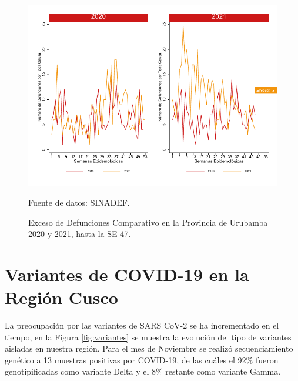 \documentclass[12pt,a4paper,openany]{book}
\begin{document}
		\begin{figure}[h]
			\caption{Exceso de Defunciones Comparativo en la Provincia de Urubamba 2020 y 2021, hasta la SE 47.}\label{fig:exceso_urub}
			\begin{center}
				\includegraphics[width=0.7\linewidth]{../figuras/exceso_13}
			\end{center}
			{\footnotesize {Fuente de datos: SINADEF.}}
		\end{figure}
		
		\clearpage
		
		\clearpage
		
		\section* {Variantes de COVID-19 en la Región Cusco}
		\noindent La preocupación por las variantes de SARS CoV-2 se ha incrementado en el tiempo, en la Figura \ref{fig:variantes} se muestra la evolución del tipo de variantes aisladas en nuestra región. Para el mes de Noviembre se realizó secuenciamiento genético a 13 muestras positivas por COVID-19, de las cuáles el 92$\%$ fueron genotipificadas como variante Delta y el 8$\%$ restante como variante Gamma.
		
\end{document}
